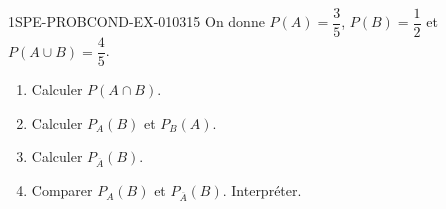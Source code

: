 \begin{exercice}{1SPE-PROBCOND-EX-010}{3}{15}
On donne $P(A) = \dfrac{3}{5}$, $P(B) = \dfrac{1}{2}$ et $P(A \cup B) = \dfrac{4}{5}$.

\begin{enumerate}
  \item Calculer $P(A \cap B)$.
  \item Calculer $P_A(B)$ et $P_B(A)$.
  \item Calculer $P_{\overline{A}}(B)$.
  \item Comparer $P_A(B)$ et $P_{\overline{A}}(B)$. Interpréter.
\end{enumerate}
\end{exercice}
